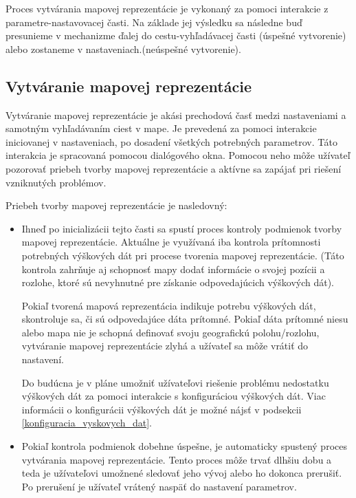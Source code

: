 Proces vytvárania mapovej reprezentácie je vykonaný za pomoci interakcie z parametre-nastavovacej časti. Na základe jej výsledku sa následne buď presunieme v mechanizme ďalej do cestu-vyhľadávacej časti (úspešné vytvorenie) alebo zostaneme v nastaveniach.(neúspešné vytvorenie).  

\subsection{Vytváranie mapovej reprezentácie}

Vytváranie mapovej reprezentácie je akási prechodová časť medzi nastaveniami a samotným vyhľadávaním ciest v mape. Je prevedená za pomoci interakcie iniciovanej v nastaveniach, po dosadení všetkých potrebných parametrov. Táto interakcia je spracovaná pomocou dialógového okna. Pomocou neho môže užívateľ pozorovať priebeh tvorby mapovej reprezentácie a aktívne sa zapájať pri riešení vzniknutých problémov.  

Priebeh tvorby mapovej reprezentácie je nasledovný:
\begin{itemize}
    \item Ihneď po inicializácii tejto časti sa spustí proces kontroly podmienok tvorby mapovej reprezentácie. Aktuálne je využívaná iba kontrola prítomnosti potrebných výškových dát pri procese tvorenia mapovej reprezentácie. (Táto kontrola zahrňuje aj schopnosť mapy dodať informácie o svojej pozícii a rozlohe, ktoré sú nevyhnutné pre získanie odpovedajúcich výškových dát).
    
    Pokiaľ tvorená mapová reprezentácia indikuje potrebu výškových dát, skontroluje sa, či sú odpovedajúce dáta prítomné. Pokiaľ dáta prítomné niesu alebo mapa nie je schopná definovať svoju geografickú polohu/rozlohu, vytváranie mapovej reprezentácie zlyhá a užívateľ sa môže vrátiť do nastavení. 
    
    Do budúcna je v pláne umožniť užívateľovi riešenie problému nedostatku výškových dát za pomoci interakcie s konfiguráciou výškových dát. Viac informácii o konfigurácii výškových dát je možné nájsť v podsekcii \ref{konfiguracia_vyskovych_dat}.
    \item Pokiaľ kontrola podmienok dobehne úspešne, je automaticky spustený proces vytvárania mapovej reprezentácie. Tento proces môže trvať dlhšiu dobu a teda je užívateľovi umožnené sledovať jeho vývoj alebo ho dokonca prerušiť. Po prerušení je užívateľ vrátený naspäť do nastavení parametrov.
\end{itemize}

